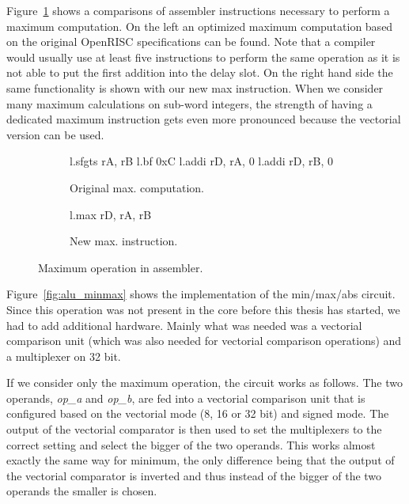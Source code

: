 Figure~\ref{fig:max_inst} shows a comparisons of assembler instructions
necessary to perform a maximum computation. On the left an optimized maximum
computation based on the original OpenRISC specifications can be found. Note
that a compiler would usually use at least five instructions to perform the
same operation as it is not able to put the first addition into the delay slot.
On the right hand side the same functionality is shown with our new max
instruction.  When we consider many maximum calculations on sub-word integers,
the strength of having a dedicated maximum instruction gets even more pronounced
because the vectorial version can be used.

\newenvironment{shellenv2}%
{%
   \begin{Sbox}\begin{minipage}{\textwidth}\begin{texttt}%
 }%
 {\end{texttt}\end{minipage}\end{Sbox}%
 \setlength{\fboxsep}{6pt}\shadowbox{\TheSbox}}%


\begin{figure}[H]
 \begin{subfigure}[b]{0.45\linewidth}
\begin{instrenv}
l.sfgts rA, rB
l.bf 0xC
l.addi rD, rA, 0
l.addi rD, rB, 0
\end{instrenv}
  \caption{Original max. computation.}
 \end{subfigure}\hfill
 \begin{subfigure}[b]{0.45\linewidth}
  \begin{instrenv}
l.max rD, rA, rB
  \end{instrenv}
  \caption{New max. instruction.}
 \end{subfigure}

 \caption{Maximum operation in assembler.}
 \label{fig:max_inst}
\end{figure}


Figure~\ref{fig:alu_minmax} shows the implementation of the min/max/abs circuit.
Since this operation was not present in the \orion core before this thesis has
started, we had to add additional hardware. Mainly what was needed was a
vectorial comparison unit (which was also needed for vectorial comparison
operations) and a multiplexer on 32 bit.

If we consider only the maximum operation, the circuit works as follows.
The two operands, \textit{op\_a} and \textit{op\_b}, are fed into a vectorial
comparison unit that is configured based on the vectorial mode (8, 16 or 32 bit)
and signed mode. The output of the vectorial comparator is then used to set the
multiplexers to the correct setting and select the bigger of the two operands.
This works almost exactly the same way for minimum, the only difference being
that the output of the vectorial comparator is inverted and thus instead of the
bigger of the two operands the smaller is chosen.

